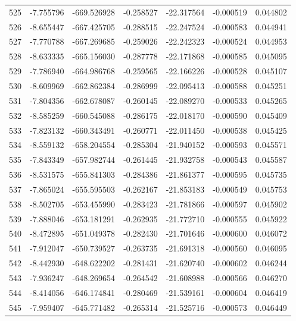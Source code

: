 \begin{tabular}{rrrrrrr}
 525 &  -7.755796 & -669.526928 & -0.258527 & -22.317564 &  -0.000519 &  0.044802 \\
 526 &  -8.655447 & -667.425705 & -0.288515 & -22.247524 &  -0.000583 &  0.044941 \\
 527 &  -7.770788 & -667.269685 & -0.259026 & -22.242323 &  -0.000524 &  0.044953 \\
 528 &  -8.633335 & -665.156030 & -0.287778 & -22.171868 &  -0.000585 &  0.045095 \\
 529 &  -7.786940 & -664.986768 & -0.259565 & -22.166226 &  -0.000528 &  0.045107 \\
 530 &  -8.609969 & -662.862384 & -0.286999 & -22.095413 &  -0.000588 &  0.045251 \\
 531 &  -7.804356 & -662.678087 & -0.260145 & -22.089270 &  -0.000533 &  0.045265 \\
 532 &  -8.585259 & -660.545088 & -0.286175 & -22.018170 &  -0.000590 &  0.045409 \\
 533 &  -7.823132 & -660.343491 & -0.260771 & -22.011450 &  -0.000538 &  0.045425 \\
 534 &  -8.559132 & -658.204554 & -0.285304 & -21.940152 &  -0.000593 &  0.045571 \\
 535 &  -7.843349 & -657.982744 & -0.261445 & -21.932758 &  -0.000543 &  0.045587 \\
 536 &  -8.531575 & -655.841303 & -0.284386 & -21.861377 &  -0.000595 &  0.045735 \\
 537 &  -7.865024 & -655.595503 & -0.262167 & -21.853183 &  -0.000549 &  0.045753 \\
 538 &  -8.502705 & -653.455990 & -0.283423 & -21.781866 &  -0.000597 &  0.045902 \\
 539 &  -7.888046 & -653.181291 & -0.262935 & -21.772710 &  -0.000555 &  0.045922 \\
 540 &  -8.472895 & -651.049378 & -0.282430 & -21.701646 &  -0.000600 &  0.046072 \\
 541 &  -7.912047 & -650.739527 & -0.263735 & -21.691318 &  -0.000560 &  0.046095 \\
 542 &  -8.442930 & -648.622202 & -0.281431 & -21.620740 &  -0.000602 &  0.046244 \\
 543 &  -7.936247 & -648.269654 & -0.264542 & -21.608988 &  -0.000566 &  0.046270 \\
 544 &  -8.414056 & -646.174841 & -0.280469 & -21.539161 &  -0.000604 &  0.046419 \\
 545 &  -7.959407 & -645.771482 & -0.265314 & -21.525716 &  -0.000573 &  0.046449 \\

\end{tabular}
